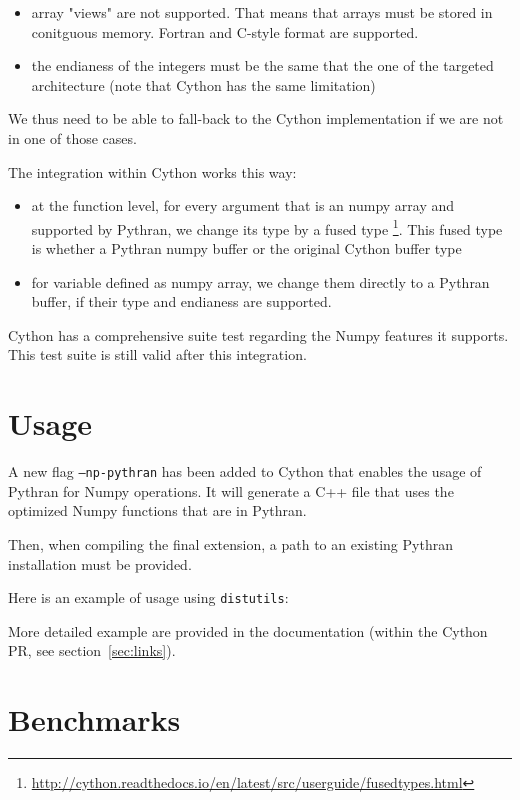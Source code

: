 \documentclass{deliverablereport}
\begin{document}
\begin{itemize}
  \item array "views" are not supported. That means that arrays must be stored
    in conitguous memory. Fortran and C-style format are supported.
  \item the endianess of the integers must be the same that the one of the
    targeted architecture (note that Cython has the same limitation)
\end{itemize}

We thus need to be able to fall-back to the Cython implementation if we are not
in one of those cases.

The integration within Cython works this way:

\begin{itemize}
  \item at the function level, for every argument that is an numpy array and
    supported by Pythran, we change its type by a fused type
    \footnote{\url{http://cython.readthedocs.io/en/latest/src/userguide/fusedtypes.html}}.
    This fused type is whether a Pythran numpy buffer or the original Cython
    buffer type
  \item for variable defined as numpy array, we change them directly to a
    Pythran buffer, if their type and endianess are supported. 
\end{itemize}

Cython has a comprehensive suite test regarding the Numpy features it supports.
This test suite is still valid after this integration.

\section{Usage}

A new flag {\tt --np-pythran} has been added to Cython that enables the usage
of Pythran for Numpy operations. It will generate a C++ file that uses the
optimized Numpy functions that are in Pythran.

Then, when compiling the final extension, a path to an existing Pythran
installation must be provided.

Here is an example of usage using {\tt distutils}:

More detailed example are provided in the documentation (within the Cython PR,
see section~\ref{sec:links}).

\section{Benchmarks}
\end{document}
